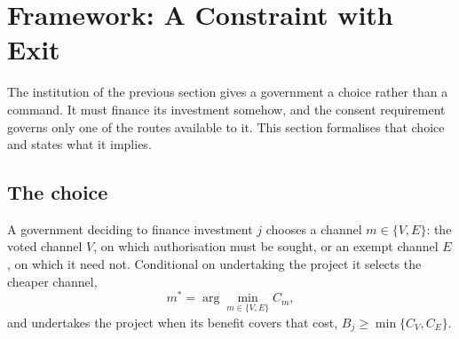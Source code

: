 %

\section{Framework: A Constraint with Exit}

The institution of the previous section gives a government a choice rather than
a command. It must finance its investment somehow, and the consent requirement
governs only one of the routes available to it. This section formalises that
choice and states what it implies.

\subsection{The choice}

A government deciding to finance investment $j$ chooses a channel
$m \in \{V, E\}$: the voted channel $V$, on which authorisation must be sought,
or an exempt channel $E$, on which it need not. Conditional on undertaking the
project it selects the cheaper channel,
\[
m^{*} = \arg\min_{m \in \{V,E\}} C_m,
\]
and undertakes the project when its benefit covers that cost,
$B_j \geq \min\{C_V, C_E\}$.

